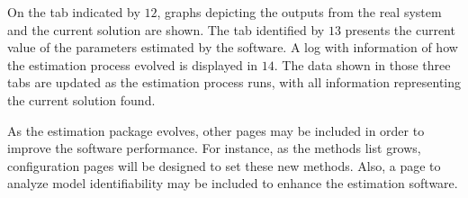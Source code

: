 On the tab indicated by $12$, graphs depicting the outputs from the real system and the current solution are shown. The tab identified by $13$ presents the current value of the parameters estimated by the software. A log with information of how the estimation process evolved is displayed in $14$. The data shown in those three tabs are updated as the estimation process runs, with all information representing the current solution found.

As the estimation package evolves, other pages may be included in order to improve the software performance. For instance, as the methods list grows, configuration pages will be designed to set these new methods. Also, a page to analyze model identifiability may be included to enhance the estimation software.